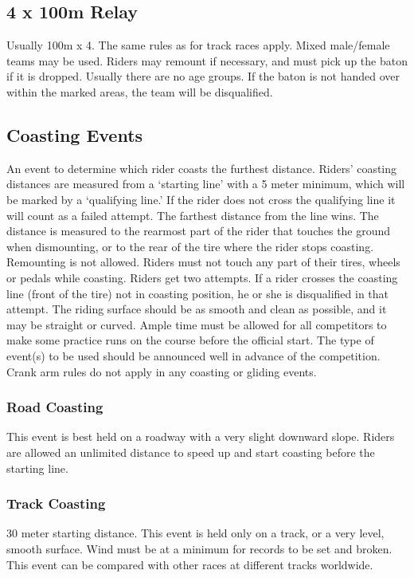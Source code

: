 \subsection{4 x 100m Relay}
Usually 100m x 4.
The same rules as for track races apply.
Mixed male/female teams may be used.
Riders may remount if necessary, and must pick up the baton if it is dropped.
Usually there are no age groups.
If the baton is not handed over within the marked areas, the team will be disqualified.

\subsection{Coasting Events}
An event to determine which rider coasts the furthest distance.
Riders' coasting distances are measured from a ‘starting line' with a 5 meter minimum, which will be marked by a `qualifying line.'
If the rider does not cross the qualifying line it will count as a failed attempt.
The farthest distance from the line wins.
The distance is measured to the rearmost part of the rider that touches the ground when dismounting, or to the rear of the tire where the rider stops coasting.
Remounting is not allowed.
Riders must not touch any part of their tires, wheels or pedals while coasting.
Riders get two attempts.
If a rider crosses the coasting line (front of the tire) not in coasting position, he or she is disqualified in that attempt.
The riding surface should be as smooth and clean as possible, and it may be straight or curved.
Ample time must be allowed for all competitors to make some practice runs on the course before the official start.
The type of event(s) to be used should be announced well in advance of the competition.
Crank arm rules do not apply in any coasting or gliding events.

\subsubsection{Road Coasting}
This event is best held on a roadway with a very slight downward slope.
Riders are allowed an unlimited distance to speed up and start coasting before the starting line.

\subsubsection{Track Coasting \label{subsubsec:racing_alternate-optional-fun-events_coasting_track-coasting}}
30 meter starting distance.
This event is held only on a track, or a very level, smooth surface.
Wind must be at a minimum for records to be set and broken.
This event can be compared with other races at different tracks worldwide.


